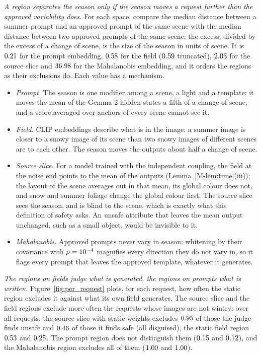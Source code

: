 \documentclass{article}
\newcommand{\mref}[1]{\ref{M-#1}}        %
\begin{document}
\emph{A region separates the season only if the season moves a request further than the approved variability does.} For each
space, compare the median distance between a summer prompt and an approved prompt of the same scene with the median distance between
two approved prompts of the same scene; the excess, divided by the excess of a change of scene, is the size of the season in units of
scene. It is $0.21$ for the prompt embedding, $0.58$ for the field ($0.59$ truncated), $2.03$ for the source slice
and $36.98$ for the Mahalanobis embedding, and it orders the regions as their exclusions do. Each value has a mechanism.
\begin{itemize}
\item \emph{Prompt.} The season is one modifier among a scene, a light and a template: it moves the mean of the Gemma-2 hidden
states a fifth of a change of scene, and a score averaged over anchors of every scene cannot see it.
\item \emph{Field.} CLIP embeddings describe what is in the image: a summer image is closer to a snowy image of its scene than
two snowy images of different scenes are to each other. The season moves the outputs about half a change of scene.
\item \emph{Source slice.} For a model trained with the independent coupling, the field at the noise end points to the mean of the
outputs (Lemma~\mref{lem:time}(iii)); the layout of the scene averages out in that mean, its global colour does not, and snow and
summer foliage change the global colour first. The source slice sees the season, and is blind to the scene, which is exactly what
this definition of safety asks. An unsafe attribute that leaves the mean output unchanged, such as a small object, would be
invisible to it.
\item \emph{Mahalanobis.} Approved prompts never vary in season: whitening by their covariance with $\rho=10^{-4}$ magnifies every
direction they do not vary in, so it flags every prompt that leaves the approved template, whatever it generates.
\end{itemize}

\emph{The regions on fields judge what is generated, the regions on prompts what is written.} Figure~\ref{fig:per_request} plots,
for each request, how often the static region excludes it against what its own field generates. The source slice and the field regions exclude more
often the requests whose images are not wintry: over all requests, the source slice with static weights excludes $0.95$ of
those the judge finds unsafe and $0.46$ of those it finds safe (all disguised), the static field region $0.53$ and
$0.25$. The prompt region does not distinguish them ($0.15$ and $0.12$), and the Mahalanobis region excludes all of
them ($1.00$ and $1.00$).
\end{document}
